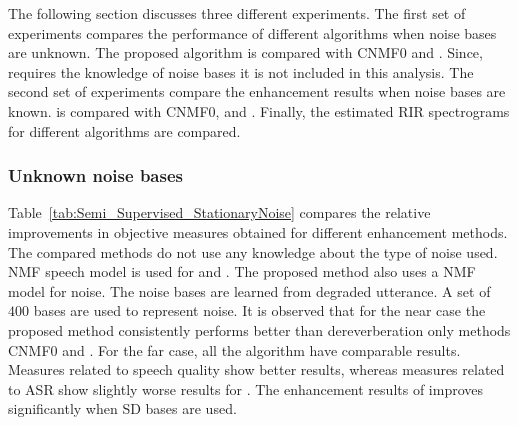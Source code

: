 The following section discusses three different experiments. The first set of experiments compares the performance of different algorithms when noise bases are unknown. The proposed algorithm  is compared with CNMF0 and . Since,  requires the knowledge of noise bases it is not included in this analysis. The second set of experiments compare the enhancement results when noise bases are known.  is compared with CNMF0,  and . Finally, the estimated RIR spectrograms for different algorithms are compared.

\subsubsection{Unknown noise bases}
\label{sec:unknown_noise_cond}
Table~\ref{tab:Semi_Supervised_StationaryNoise} compares the relative improvements in objective measures obtained for different enhancement methods. The compared methods do not use any knowledge about the type of noise used. NMF speech model is used for  and . The proposed method  also uses a NMF model for noise. The noise bases are learned from degraded utterance. A set of $400$ bases are used to represent noise. It is observed that for the near case the proposed method  consistently performs better than dereverberation only methods CNMF0 and . For the far case, all the algorithm have comparable results. Measures related to speech quality show better results, whereas measures related to ASR show slightly worse results for . The enhancement results of  improves significantly when SD bases are used.
